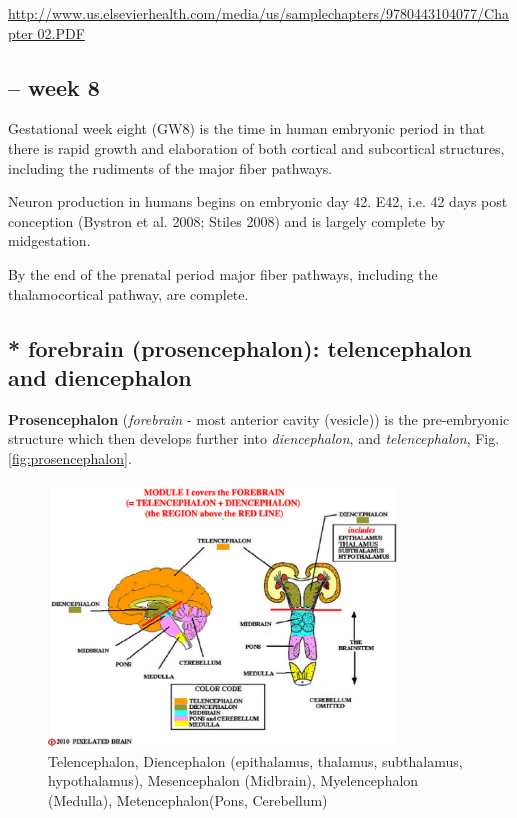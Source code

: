 \url{http://www.us.elsevierhealth.com/media/us/samplechapters/9780443104077/Chapter 02.PDF}

\subsection{-- week 8}

Gestational week eight (GW8) is the time in human embryonic period in that
there is rapid growth and elaboration of both cortical and subcortical
structures, including the rudiments of the major fiber pathways.

Neuron production in humans begins on embryonic day 42. E42, i.e. 42 days post
conception (Bystron et al. 2008; Stiles 2008) and is largely complete by
midgestation.

By the end of the prenatal period major fiber pathways, including the
thalamocortical pathway, are complete. 

\subsection{* forebrain (prosencephalon): telencephalon and diencephalon}
\label{sec:forebrain}

{\bf Prosencephalon} ({\it forebrain} - most anterior cavity (vesicle)) is the
pre-embryonic structure which then develops further into {\it diencephalon}, and
{\it telencephalon}, Fig.\ref{fig:prosencephalon}.

\begin{figure}[hbt]
  \centerline{
  \includegraphics[height=7cm,
    angle=0]{./images/prosencephalon.eps}}
\caption{Telencephalon, Diencephalon (epithalamus, thalamus, subthalamus,
hypothalamus), Mesencephalon (Midbrain), Myelencephalon (Medulla),
Metencephalon(Pons, Cerebellum)}
\label{fig:prosencephalon}
\label{fig:mesencephalon}
\label{fig:myelencephalon}
\end{figure}

